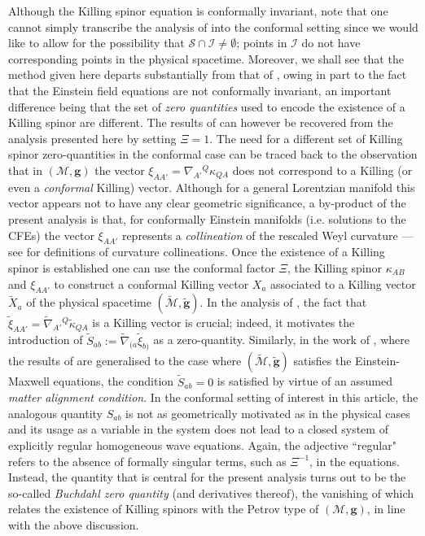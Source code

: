 \documentclass[10pt,a4paper]{article}
\theoremstyle{plain}
\def\bmg{{\bm g}}
\begin{document}
Although the Killing spinor equation is conformally invariant, note that one cannot simply transcribe the analysis of \cite{GarVal08c,
  BaeVal10b} into the conformal setting since we would like to allow for the possibility that $\mathcal{S}\cap\mathscr{I}\neq \emptyset$; points in $\mathscr{I}$ do not have corresponding points in the physical spacetime.
Moreover, we shall see that the method given here departs substantially from that of \cite{GarVal08c,
  BaeVal10b}, owing in part to the fact that the Einstein field
equations are not conformally invariant, an important difference being that the set of
\emph{zero quantities} used to encode the existence of a Killing spinor are different. The results of
\cite{GarVal08c} can however be recovered from the analysis presented here by
setting $\Xi = 1$. The need for a different
set of Killing spinor zero-quantities in the
conformal case can be traced back to the observation that in
$(\mathcal{M},\bmg)$ the vector
$\xi_{AA'}=\nabla_{A'}{}^{Q}\kappa_{QA}$ does not correspond to a Killing (or even a \emph{conformal} Killing) vector. Although for a general Lorentzian manifold
this vector appears not to have any clear geometric significance, a
by-product of the present analysis is that, for conformally Einstein
manifolds (i.e. solutions to the CFEs)
the vector $\xi_{AA'}$ represents a \emph{collineation} of the rescaled Weyl curvature ---see \cite{KatLevDav69} for definitions of curvature
collineations.  Once the existence of a Killing spinor is established
one can use the conformal factor $\Xi$, the Killing spinor
$\kappa_{AB}$ and $\xi_{AA'}$ to construct a conformal Killing vector
$X_{a}$ associated to a Killing vector $\tilde{X}_{a}$ of the physical
spacetime $(\tilde{\mathcal{M}},\tilde{\bmg})$. In the analysis of
\cite{GarVal08c}, the fact that
$\tilde{\xi}_{AA'}=\tilde{\nabla}_{A'}{}^{Q}\tilde{\kappa}_{QA}$ is a
Killing vector is crucial;
indeed, it motivates the introduction of
$\tilde{S}_{ab} := \tilde{\nabla}_{(a}\tilde{\xi}_{b)}$ as a
zero-quantity.  Similarly,
in the work of \cite{ValCol16}, where the results of \cite{GarVal08c}
are generalised to the case where $(\tilde{\mathcal{M}},\tilde{\bmg})$
satisfies the Einstein-Maxwell equations, the condition
$\tilde{S}_{ab}=0$ is satisfied by virtue of an assumed \emph{matter
alignment condition}. In the conformal setting of interest in this article, the analogous quantity $S_{ab}$ is not as geometrically
motivated as in the physical cases and its usage as a variable in the
system does not lead to a closed system of explicitly regular
homogeneous wave equations. Again, the adjective ``regular" refers to the absence of formally singular terms, such as $\Xi^{-1}$, in the
equations. Instead, the quantity that is central for the present
analysis turns out to be the so-called \emph{Buchdahl zero quantity} (and
derivatives thereof), the vanishing of which relates the existence of Killing spinors with the Petrov type of $(\mathcal{M},\bmg)$, in line with the above discussion.
\end{document}
